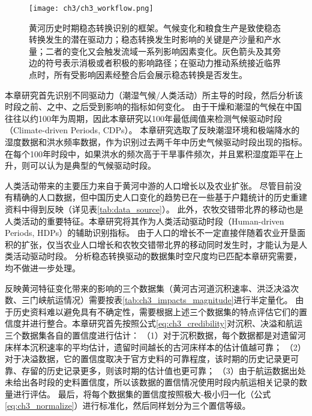 \begin{figure}[htb] %
    \centering
    \texttt{[image: ch3/ch3\_workflow.png]}
    \caption[黄河历史时期水沙特征的稳态转换识别框架]{黄河历史时期稳态转换识别的框架。气候变化和粮食生产是致使稳态转换发生的潜在驱动力；稳态转换发生时影响的关键是产沙量和产水量；二者的变化又会触发流域一系列影响因素变化。灰色箭头及其旁边的符号表示消极或者积极的影响路径；在驱动力推动系统接近临界点时，所有受影响因素经整合后会展示稳态转换是否发生。}\label{fig:ch3:regime_shift_detect}
\end{figure}


本章研究首先识别不同驱动力（潮湿气候/人类活动）所主导的时段，然后分析该时段之前、之中、之后受到影响的指标如何变化。
由于干燥和潮湿的气候在中国往往以约100年为周期\cite{GeQuanSheng2011}，因此本章研究以100年最低阈值来检测气候驱动时段（Climate-driven Periods, CDPs）。
本章研究选取了反映潮湿环境和极端降水的湿度数据和洪水频率数据，作为识别过去两千年中历史气候驱动时段出现的指标。
在每个100年时段中，如果洪水的频次高于干旱事件频次，并且累积湿度距平在上升，则可以认为是典型的气候驱动时段。

人类活动带来的主要压力来自于黄河中游的人口增长以及农业扩张。
尽管目前没有精确的人口数据，但中国历史人口变化的趋势已在一些基于户籍统计的历史重建资料中得到反映（详见表\ref{tab:data_source}）。
此外，农牧交错带北界的移动也是人类活动的重要特征。本章研究将其作为人类活动驱动时段（Human-driven Periods, HDPs）的辅助识别指标。
由于人口的增长不一定直接伴随着农业开垦面积的扩张，仅当农业人口增长和农牧交错带北界的移动同时发生时，才能认为是人类活动驱动时段。
分析稳态转换驱动的数据集时空尺度均已匹配本章研究需要，均不做进一步处理。


反映黄河特征变化带来的影响的三个数据集（黄河古河道沉积速率、洪泛决溢次数、三门峡航运情况）需要按表\ref{tab:ch3_impacts_magnitude}进行半定量化。
由于历史资料难以避免具有不确定性，需要根据上述三个数据集的特点评估它们的置信度并进行整合。本章研究首先按照公式\ref{eq:ch3_credibility}对沉积、决溢和航运三个数据集各自的置信度进行估计：
（1）对于沉积数据，每个数据都是对遗留河床样本沉积速率的平均估计，遗留时间越长的古河床样本的估计值越可靠；
（2）对于决溢数据，它的置信度取决于官方史料的可靠程度，该时期的历史记录更可靠、存留的历史记录更多，则该时期的估计值也更可靠；
（3）由于航运数据出处未给出各时段的史料置信度，所以该数据的置信情况使用时段内航运相关记录的数量进行评估。
最后，将每个数据集的置信度按照极大-极小归一化（公式\ref{eq:ch3_normalize}）进行标准化，然后同样划分为三个置信等级。

